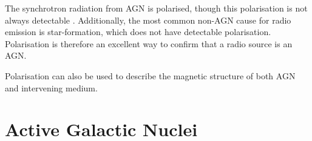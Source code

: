         The synchrotron radiation from AGN is polarised, though this polarisation is not always detectable \citeneeded {}. Additionally, the most common non-AGN cause for radio emission is star-formation, which does not have detectable polarisation. Polarisation is therefore an excellent way to confirm that a radio source is an AGN.

        Polarisation can also be used to describe the magnetic structure of both AGN and intervening medium.


\section{Active Galactic Nuclei}
\label{sec:agn}

